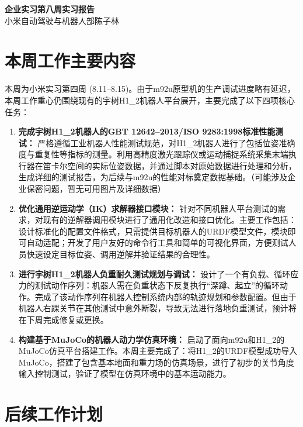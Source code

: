 \documentclass{ctexart}
\begin{document}
\begin{center}
    \LARGE \textbf{企业实习\;第八周实习报告}\\
    \vspace{10pt}
    \normalsize 小米自动驾驶与机器人部\;\;陈子林
\end{center}

\section{本周工作主要内容}

本周为小米实习第四周 (8.11--8.15)。由于m92u原型机的生产调试进度略有延迟，本周工作重心仍围绕现有的宇树H1\_2机器人平台展开，主要完成了以下四项核心任务：

\begin{enumerate}
    \item \textbf{完成宇树H1\_2机器人的GBT 12642--2013/ISO 9283:1998标准性能测试：}
          严格遵循工业机器人性能测试规范，对H1\_2机器人进行了包括位姿准确度与重复性等指标的测量。利用高精度激光跟踪仪或运动捕捉系统采集末端执行器在笛卡尔空间的实际位姿数据，并通过脚本对原始数据进行处理和分析，生成详细的测试报告，为后续与m92u的性能对标奠定数据基础。（可能涉及企业保密问题，暂无可用图片及详细数据）

    \item \textbf{优化通用逆运动学（IK）求解器接口模块：}
          针对不同机器人平台测试的需求，对现有的逆解器调用模块进行了通用化改造和接口优化。主要工作包括：设计标准化的配置文件格式，只需提供目标机器人的URDF模型文件，模块即可自动适配；开发了用户友好的命令行工具和简单的可视化界面，方便测试人员快速设定目标位姿、调用逆解并验证结果的合理性。

    \item \textbf{进行宇树H1\_2机器人负重耐久测试规划与调试：}
          设计了一个有负载、循环应力的测试动作序列：机器人需在负重状态下反复执行“深蹲、起立”的循环动作。完成了该动作序列在机器人控制系统内部的轨迹规划和参数配置。但由于机器人右踝关节在其他测试中意外断裂，导致无法进行落地负重测试，预计将在下周完成修复或更换。

    \item \textbf{构建基于MuJoCo的机器人动力学仿真环境：}
          启动了面向m92u和H1\_2的MuJoCo仿真平台搭建工作。本周主要完成了：将H1\_2的URDF模型成功导入MuJoCo，搭建了包含基本地面和重力场的仿真场景，进行了初步的关节角度输入控制测试，验证了模型在仿真环境中的基本运动能力。
\end{enumerate}

\section{后续工作计划}
\end{document}
